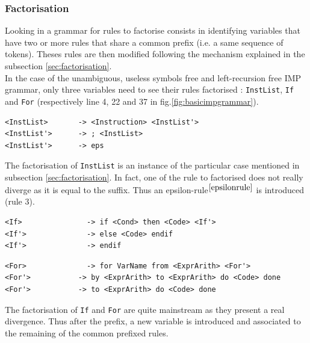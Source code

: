 \documentclass[a4paper,11pt]{article}
\begin{document}
    \subsubsection{Factorisation}
      Looking in a grammar for rules to factorise consists in identifying variables that have two or more rules that share a common prefix (i.e. a same sequence of tokens). Theses rules are then modified following the mechanism explained in the subsection \ref{sec:factorisation}.\\
      In the case of the unambiguous, useless symbols free and left-recursion free IMP grammar, only three variables need to see their rules factorised : \verb|InstList|, \verb|If| and \verb|For| (respectively line 4, 22 and 37 in fig.\ref{fig:basicimpgrammar}).
      \begin{lstlisting}
<InstList>	     -> <Instruction> <InstList'> 
<InstList'>	     -> ; <InstList> 
<InstList'>	     -> eps\end{lstlisting}
      The factorisation of \verb|InstList| is an instance of the particular case mentioned in subsection \ref{sec:factorisation}. In fact, one of the rule to factorised does not really diverge as it is equal to the suffix. Thus an epsilon-rule$^{\ref{epsilonrule}}$ is introduced (rule 3).
      \begin{lstlisting}
<If>	           -> if <Cond> then <Code> <If'> 
<If'>	           -> else <Code> endif 
<If'>	           -> endif\end{lstlisting}
      \begin{lstlisting}
<For>	           -> for VarName from <ExprArith> <For'> 
<For'>	         -> by <ExprArith> to <ExprArith> do <Code> done 
<For'>	         -> to <ExprArith> do <Code> done\end{lstlisting}
      The factorisation of \verb|If| and \verb|For| are quite mainstream as they present a real divergence. Thus after the prefix,  a new variable is introduced and associated to the remaining of the common prefixed rules.
      
\end{document}

